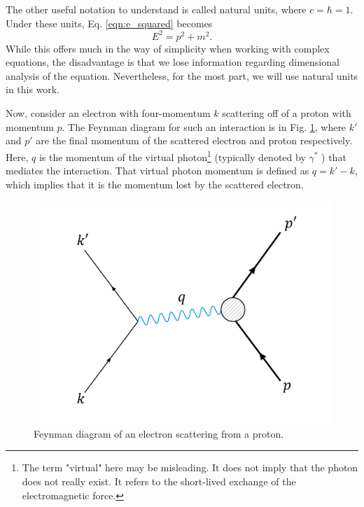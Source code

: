 The other useful notation to understand is called natural units, where $c=\hbar=1$. Under these units, Eq. \ref{eqn:e_squared} becomes
\begin{equation}
E^2 = p^2 + m^2.
\end{equation}
While this offers much in the way of simplicity when working with complex equations, the disadvantage is that we lose information regarding dimensional analysis of the equation. Nevertheless, for the most part, we will use natural units in this work.

Now, consider an electron with four-momentum $k$ scattering off of a proton with momentum $p$. The Feynman diagram for such an interaction is in Fig. \ref{fig:feyn_epscatt}, where $k'$ and $p'$ are the final momentum of the scattered electron and proton respectively. Here, $q$ is the momentum of the virtual photon\footnote{The term "virtual" here may be misleading. It does not imply that the photon does not really exist. It refers to the short-lived exchange of the electromagnetic force.} (typically denoted by $\gamma^{*}$ ) that mediates the interaction. That virtual photon momentum is defined as $q=k'-k$, which implies that it is the momentum lost by the scattered electron.

\begin{figure}[h!]
	\centering
	\includegraphics[width=0.6\linewidth]{figures/feyn_epscatt.png}
	\caption{Feynman diagram of an electron scattering from a proton.}
	\label{fig:feyn_epscatt}
\end{figure}

